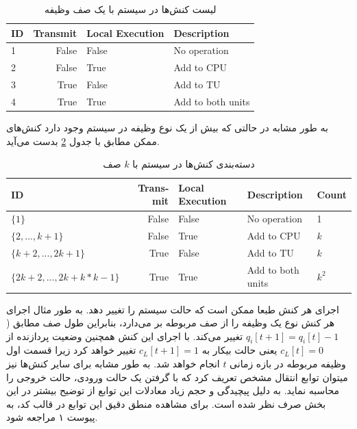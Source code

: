 \begin{table}[H]
	\centering
	\begin{latin}
		\begin{tabular}{@{}lrll@{}}
			\toprule
			\textbf{ID} & \textbf{Transmit} & \textbf{Local Execution} & \textbf{Description} \\ \midrule
			1           & False             & False                    & No operation         \\
			2           & False             & True                     & Add to CPU           \\
			3           & True              & False                    & Add to TU            \\
			4           & True              & True                     & Add to both units    \\ \bottomrule
		\end{tabular}
	\end{latin}
	\caption{لیست کنش‌ها در سیستم با یک صف وظیفه}
	\label{table:actions}
\end{table}
به طور مشابه در حالتی که بیش از یک نوع وظیفه در سیستم وجود دارد کنش‌های ممکن مطابق با جدول \ref{table:actions-multiqueue} بدست می‌آید.
\begin{table}[H]
	\centering
	\begin{latin}
		\begin{tabular}{@{}lrlll@{}}
			\toprule
			\textbf{ID}                     & \textbf{Transmit} & \textbf{Local Execution} & \textbf{Description} & \textbf{Count}                \\ \midrule
			$\{1\}$                           & False             & False                    & No operation         & 1                    \\
			$\{2, ..., k + 1\}$               & False             & True                     & Add to CPU           & $k$                    \\
			$\{k + 2, ..., 2k + 1\}$          & True              & False                    & Add to TU            & $k$                    \\
			$\{2k + 2, ..., 2k + k * k - 1\}$ & True              & True                     & Add to both units    & $k^2$ \\ \bottomrule
		\end{tabular}
	\end{latin}
	\caption{دسته‌بندی کنش‌ها در سیستم با $k$ صف}
	\label{table:actions-multiqueue}
\end{table}
اجرای هر کنش طبعا ممکن است که حالت سیستم را تغییر دهد. به طور مثال اجرای هر کنش نوع  یک وظیفه را از صف مربوطه بر می‌دارد، بنابراین طول صف مطابق (\(q_i[t + 1] = q_i[t] - 1\) تغییر می‌کند. با اجرای این کنش همچنین وضعیت پردازنده از \(c_L[t] = 0\) یعنی حالت بیکار به \(c_L[t + 1] = 1\) تغییر خواهد کرد زیرا قسمت اول وظیفه مربوطه در بازه زمانی \(t\) انجام خواهد شد. به طور مشابه برای سایر کنش‌ها نیز میتوان توابع انتقال مشخص تعریف کرد که با گرفتن یک حالت ورودی، حالت خروجی را محاسبه نماید. به دلیل پیچیدگی و حجم زیاد معادلات این توابع از توضیح بیشتر در این بخش صرف نظر شده است. برای مشاهده منطق دقیق این توابع در قالب کد، به پیوست ۱ مراجعه شود.
